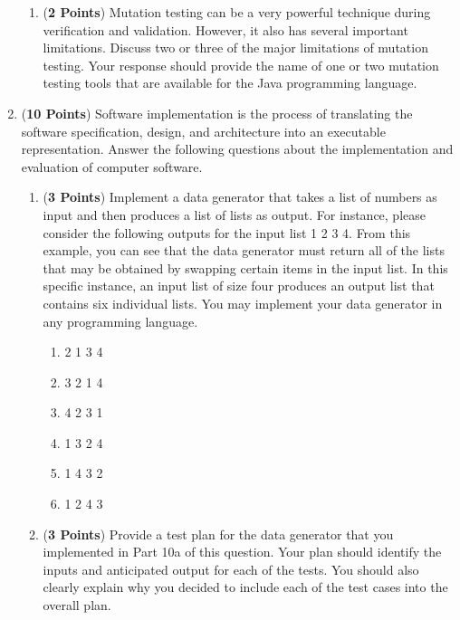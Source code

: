 \documentclass[12pt,epsf,psfig,graphics]{article}
\begin{document}
\begin{enumerate}
\begin{enumerate}
\item ({\bf 2 Points}) Mutation testing can be a very powerful
  technique during verification and validation.  However, it also has
  several important limitations.  Discuss two or three of the major
  limitations of mutation testing.  Your response should provide the
  name of one or two mutation testing tools that are available for the
  Java programming language.

\end{enumerate}

\newpage

\item ({\bf 10 Points}) Software implementation is the process of
  translating the software specification, design, and architecture
  into an executable representation.  Answer the following questions
  about the implementation and evaluation of computer software.

\begin{enumerate}

  \item ({\bf 3 Points}) Implement a data generator that takes a list
    of numbers as input and then produces a list of lists as output.
    For instance, please consider the following outputs for the input
    list 1 2 3 4.  From this example, you can see that the data
    generator must return all of the lists that may be obtained by
    swapping certain items in the input list.  In this specific
    instance, an input list of size four produces an output list that
    contains six individual lists.  You may implement your data
    generator in any programming language.

    \begin{enumerate}

    \item 2 1 3 4
      
    \item 3 2 1 4

    \item 4 2 3 1

    \item 1 3 2 4
        
    \item 1 4 3 2

    \item 1 2 4 3

  \end{enumerate}

  \item ({\bf 3 Points}) Provide a test plan for the data generator
    that you implemented in Part 10a of this question.  Your plan
    should identify the inputs and anticipated output for each of the
    tests.  You should also clearly explain why you decided to include
    each of the test cases into the overall plan.


\end{enumerate}
\end{enumerate}
\end{document}
